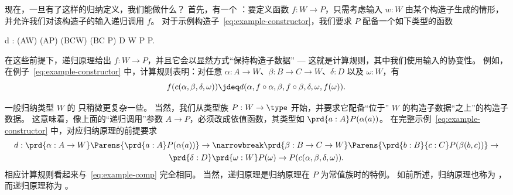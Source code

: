 %
现在，一旦有了这样的归纳定义，我们能做什么？
首先，有一个 ：要定义函数 $f:W\to P$，只需考虑输入 $w:W$ 由某个构造子生成的情形，并允许我们对该构造子的输入递归调用 $f$。
对于示例构造子~\eqref{eq:example-constructor}，我们要求 $P$ 配备一个如下类型的函数
\begin{narrowmultline}\label{eq:example-rechyp}
  d : (A\to W) \to (A\to P) \to (B\to C\to W) \to
  \narrowbreak
  (B\to C \to P) \to D \to W \to P \to P.
\end{narrowmultline}
在这些前提下，递归原理给出 $f:W\to P$，并且它会以显然方式“保持构造子数据”%
--- 这就是计算规则，其中我们使用输入的协变性。
例如，在例子~\eqref{eq:example-constructor} 中，计算规则表明：对任意 $\alpha:A\to W$、$\beta:B\to C\to W$、$\delta:D$ 以及 $\omega:W$，有
\begin{equation}
  f(c(\alpha,\beta,\delta,\omega)) \jdeq d(\alpha,f\circ \alpha,\beta, f\circ \beta, \delta, \omega,f(\omega)).\label{eq:example-comp}
\end{equation}

%
一般归纳类型 $W$ 的  只稍微更复杂一些。
当然，我们从类型族 $P:W\to\type$ 开始，并要求它配备“位于” $W$ 的构造子数据“之上”的构造子数据。
这意味着，像上面的“递归调用”参数 $A\to P$，必须改成依值函数，其类型如 $\prd{a:A} P(\alpha(a))$。
在完整示例~\eqref{eq:example-constructor} 中，对应归纳原理的前提要求
\begin{multline}\label{eq:example-indhyp}
d : \prd{\alpha:A\to W}\Parens{\prd{a:A} P(\alpha(a))} \to \narrowbreak
\prd{\beta:B\to C\to W} \Parens{\prd{b:B}{c:C} P(\beta(b,c))} \to\\
\prd{\delta:D}
\prd{\omega:W} P(\omega) \to
P(c(\alpha,\beta,\delta,\omega)).
\end{multline}
相应计算规则看起来与~\eqref{eq:example-comp} 完全相同。
当然，递归原理是归纳原理在 $P$ 为常值族时的特例。
如前所述，归纳原理也称为 ，而递归原理称为 。

